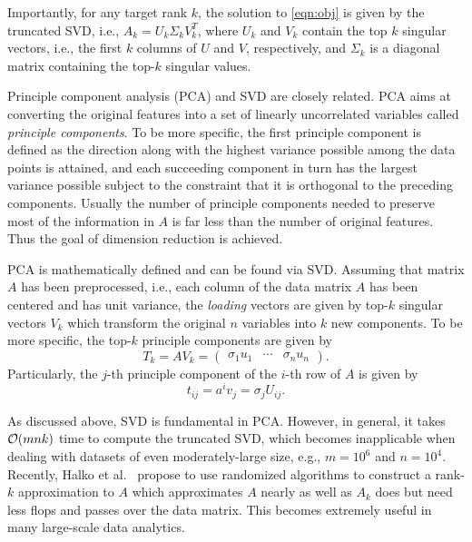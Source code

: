  
Importantly, for any target rank $k$, the solution to \eqref{eqn:obj} is given by the truncated SVD, i.e., $A_k = U_k \Sigma_k V_k^T$, where $U_k$ and $V_k$ contain the top $k$ singular vectors, i.e., the first $k$ columns of $U$ and $V$, respectively, and $\Sigma_k$ is a diagonal matrix containing the top-$k$ singular values.

Principle component analysis (PCA) and SVD are closely related.
PCA aims at converting the original features into a set of linearly uncorrelated variables called {\it principle components}.
To be more specific, the first principle component is defined as the direction along with the highest variance possible among the data points is attained, and each succeeding component in turn has the largest variance possible subject to the constraint that it is orthogonal to the preceding components.
Usually the number of principle components needed to preserve most of the information in $A$ is far less than the number of original features. Thus the goal of dimension reduction is achieved.

PCA is mathematically defined and can be found via SVD.
Assuming that matrix $A$ has been preprocessed, i.e., each column of the data matrix $A$ has been centered and has unit variance, the {\it loading} vectors are given by top-$k$ singular vectors $V_k$ which transform the original $n$ variables into $k$ new components. To be more specific, the top-$k$ principle components are given by 
\begin{equation}
  T_k = A V_k = \begin{pmatrix} \sigma_1 u_1 & \cdots & \sigma_n u_n \end{pmatrix}.
\end{equation}
Particularly, the $j$-th principle component of the $i$-th row of $A$ is given by 
\begin{equation}
  t_{ij} = a^i v_j = \sigma_j U_{ij}.
\end{equation}

As discussed above, SVD is fundamental in PCA. However, in general, it takes $\operatorname{\mathcal{O}}(mnk)$ time to compute the truncated SVD, which becomes inapplicable when dealing with datasets of even moderately-large size, e.g., $m = 10^6$ and $n = 10^4$. Recently, Halko et al.~\cite{HMT11} propose to use randomized algorithms to construct a rank-$k$ approximation to $A$ which approximates $A$ nearly as well as $A_k$ does but need less flops and passes over the data matrix. This becomes extremely useful in many large-scale data analytics.


